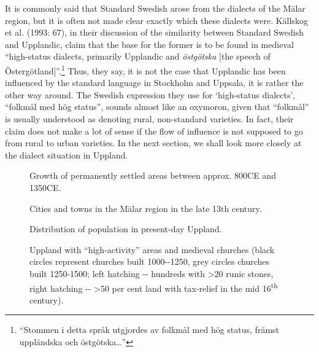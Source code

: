 It is commonly said that Standard Swedish arose from the dialects of the Mälar region, but it is often not made clear exactly which these dialects were. Källskog et al. (1993: 67), in their discussion of the similarity between Standard Swedish and Upplandic, claim that the base for the former is to be found in medieval “high-status dialects, primarily Upplandic and \textit{östgötska} [the speech of Östergötland]”.\footnote{ “Stommen i detta språk utgjordes av folkmål med hög status, främst uppländska och östgötska…”} Thus, they say, it is not the case that Upplandic has been influenced by the standard language in Stockholm and Uppsala, it is rather the other way around. The Swedish expression they use for ‘high-status dialects’, “folkmål med hög status”, sounds almost like an oxymoron, given that “folkmål” is usually understood as denoting rural, non-standard varieties. In fact, their claim does not make a lot of sense if the flow of influence is not supposed to go from rural to urban varieties. In the next section, we shall look more closely at the dialect situation in Uppland.


\begin{figure}[h]
\caption{Growth of permanently  settled areas between approx. 800CE and 1350CE. }
\label{map:6:36}
\end{figure}

\begin{figure}[h]
\caption{Cities and towns in the Mälar region  in the late 13th century. }
\label{map:6:37}
\end{figure}


\begin{figure}[h]
\caption{Distribution of population in present-day Uppland.}
\label{map:6:39}
\end{figure}

 
\begin{figure}[h]
\caption{Uppland with “high-activity” areas  and medieval churches (black circles represent churches built 1000-{}-1250, grey circles churches built 1250-1500; left hatching  {}-{}- hundreds with {\textgreater}20 runic stones, right hatching  {}-{}- {\textgreater}50 per cent land with tax-relief in the mid 16\textsuperscript{th} century).}
\label{map:6:38}
\end{figure}

  

